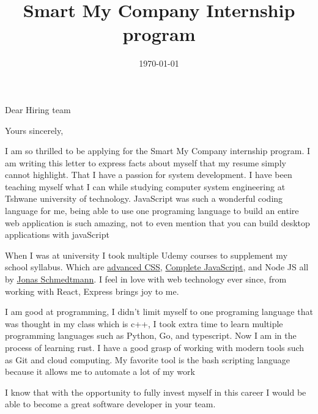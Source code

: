 \documentclass[11pt,a4paper,roman]{moderncv}        %
\title{Smart My Company Internship program}                               %
\begin{document}
\date{\today}
\opening{Dear Hiring team}
\closing{Yours sincerely,}

\makelettertitle

I am so thrilled to be applying for the Smart My Company internship program. I 
am writing this letter to express facts about myself that my resume simply cannot
highlight. That I have a passion for system development. I have been teaching 
myself what I can while studying computer system engineering at Tshwane university
of technology. JavaScript was such a wonderful coding language for me, being able to use one programing language to build an entire web application is such amazing, not to even mention that you can build desktop applications with javaScript

When I was at university I took multiple Udemy courses to supplement my school
syllabus. Which are \href{https://www.udemy.com/course/advanced-css-and-sass/}{\color{cyan} advanced CSS}, 
\href{https://www.udemy.com/course/the-complete-javascript-course/learn/}{\color{cyan}Complete JavaScript}, and Node JS all by
\href{https://twitter.com/jonasschmedtman}{\color{cyan}Jonas Schmedtmann}. I feel in love with web technology ever since, from working
with React, Express brings joy to me.


I am good at programming, I didn't limit myself to one programing language that 
was thought in my class which is c++,  I took extra time to learn multiple 
programming languages such as Python, Go, and typescript. Now I am in the process of
learning rust. I have a good grasp of working with modern tools such as Git and
cloud computing. My favorite tool is the bash scripting language because it
allows me to automate a lot of my work


I know that with the opportunity to fully invest myself in this career I would
be able to become a great software developer in your team.


\vspace{0.5cm}


\makeletterclosing
\end{document}
